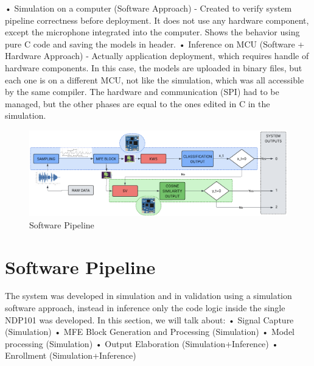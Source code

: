 • Simulation on a computer (Software Approach) - Created to verify system pipeline correctness before deployment. It does not use any hardware component, except the microphone integrated into the computer. Shows the behavior using pure C code and saving the models in header.\newline
• Inference on MCU (Software + Hardware Approach) - Actually application deployment, which requires handle of hardware components. In this case, the models are uploaded in binary files, but each one is on a different MCU, not like the simulation, which was all accessible by the same compiler. The hardware and communication (SPI) had to be managed, but the other phases are equal to the ones edited in C in the simulation.\newline
\begin{center}
    \centering
    \begin{figure}[!h]
        \includegraphics[width=1.0\textwidth]{images/4.01 Software Pipeline.png}
        \caption{Software Pipeline}
        \label{fig:software pipeline}
    \end{figure}
\end{center}
\section{Software Pipeline}
\label{sec:sw pipeline}
The system was developed in simulation and in validation using a simulation software approach, instead in inference only the code logic inside the single NDP101 was developed. In this section, we will talk about:\newline
• Signal Capture (Simulation)\newline
• MFE Block Generation and Processing (Simulation)\newline
• Model processing (Simulation)\newline
• Output Elaboration (Simulation+Inference)\newline
• Enrollment (Simulation+Inference)
